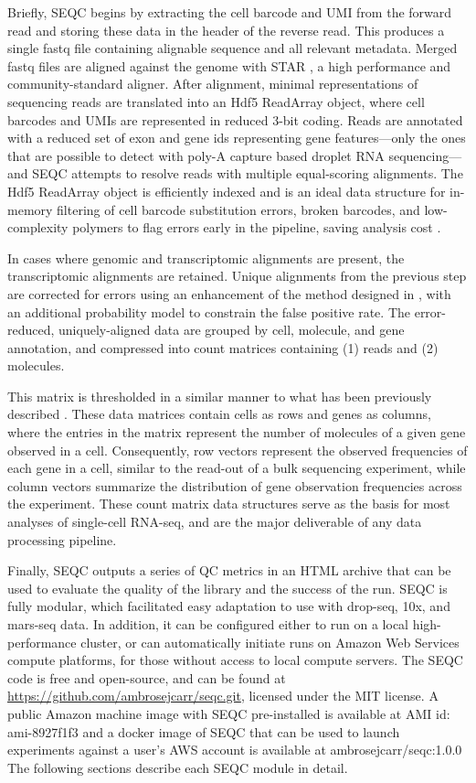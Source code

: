 Briefly, SEQC begins by extracting the cell barcode and UMI from the forward read and storing these data in the header of the reverse read.
This produces a single fastq file containing alignable sequence and all relevant metadata.
Merged fastq files are aligned against the genome with STAR \citep{Dobin2013}, a high performance and community-standard aligner. 
After alignment, minimal representations of sequencing reads are translated into an Hdf5 {\mono ReadArray} object, where cell barcodes and UMIs are represented in reduced 3-bit coding. 
Reads are annotated with a reduced set of exon and gene ids representing gene features---only the ones that are possible to detect with poly-A capture based droplet RNA sequencing---and SEQC attempts to resolve reads with multiple equal-scoring alignments.
The Hdf5 {\mono ReadArray} object is efficiently indexed and is an ideal data structure for in-memory filtering of cell barcode substitution errors, broken barcodes, and low-complexity polymers to flag errors early in the pipeline, saving analysis cost \citep{Alted2002}.

In cases where genomic and transcriptomic alignments are present, the transcriptomic alignments are retained. 
Unique alignments from the previous step are corrected for errors using an enhancement of the method designed in \cite{Jaitin2014}, with an additional probability model to constrain the false positive rate.
The error-reduced, uniquely-aligned data are grouped by cell, molecule, and gene annotation, and compressed into count matrices containing (1) reads and (2) molecules. 

This matrix is thresholded in a similar manner to what has been previously described \citep{Macosko2015,Zheng2017a}. 
These data matrices contain cells as rows and genes as columns, where the entries in the matrix represent the number of molecules of a given gene observed in a cell. 
Consequently, row vectors represent the observed frequencies of each gene in a cell, similar to the read-out of a bulk sequencing experiment, while column vectors summarize the distribution of gene observation frequencies across the experiment. 
These count matrix data structures serve as the basis for most analyses of single-cell RNA-seq, and are the major deliverable of any data processing pipeline. 

Finally, SEQC outputs a series of QC metrics in an HTML archive that can be used to evaluate the quality of the library and the success of the run. 
SEQC is fully modular, which facilitated easy adaptation to use with drop-seq, 10x, and mars-seq data.  
In addition, it can be configured either to run on a local high-performance cluster, or can automatically initiate runs on Amazon Web Services compute platforms, for those without access to local compute servers. 
The SEQC code is free and open-source, and can be found at \href{https://github.com/ambrosejcarr/seqc.git}{https://github.com/ambrosejcarr/seqc.git}, licensed under the MIT license. 
A public Amazon machine image with SEQC pre-installed is available at AMI id: {\mono ami-8927f1f3} and a docker image of SEQC that can be used to launch experiments against a user's AWS account is available at {\mono ambrosejcarr/seqc:1.0.0}
The following sections describe each SEQC module in detail. 

